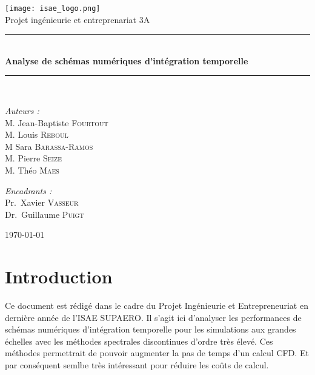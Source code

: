 \documentclass[a4paper,12pt]{report}
\theoremstyle{break}
\begin{document}

\begin{titlepage}
\begin{center}

\texttt{[image: isae\_logo.png]}\\[1cm]

{\large Projet ingénieurie et entreprenariat 3A}\\[0.5cm]


\rule{\linewidth}{0.5mm} \\[0.4cm]
{\huge \bfseries Analyse de schémas numériques d'intégration temporelle \\[0.4cm] }
\rule{\linewidth}{0.5mm} \\[1.5cm]

\noindent
\begin{minipage}{0.4\textwidth}
  \begin{flushleft} \large
    \emph{Auteurs :}\\
    M. Jean-Baptiste \textsc{Fourtout}\\
    M. Louis \textsc{Reboul}\\
    M Sara \textsc{Barassa-Ramos}\\
    M. Pierre \textsc{Seize} \\
    M. Théo   \textsc{Maes}
  \end{flushleft}
\end{minipage}%
\begin{minipage}{0.4\textwidth}
  \begin{flushright} \large
    \emph{Encadrants :} \\
    Pr.~Xavier \textsc{Vasseur}\\
    Dr.~Guillaume \textsc{Puigt}
  \end{flushright}
\end{minipage}

\vfill

\today
\end{center}
\end{titlepage}  

\tableofcontents

\chapter*{Introduction}
Ce document est rédigé dans le cadre du Projet Ingénieurie et Entrepreneuriat en dernière année de l'ISAE SUPAERO. Il s'agit ici d'analyser les performances de schémas numériques d’intégration
temporelle pour les simulations aux grandes échelles avec les méthodes spectrales discontinues d'ordre très élevé. Ces méthodes permettrait de pouvoir augmenter la pas de temps d'un calcul CFD. Et par conséquent semlbe très intéressant pour réduire les coûts de calcul.
\end{document}
